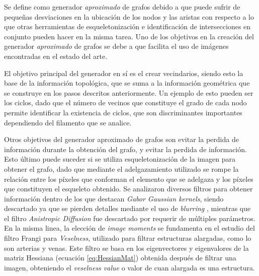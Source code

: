 Se define como generador {\it aproximado} de grafos debido a que puede sufrir de peque\~nas desviaciones en la ubicaci\'on de los nodos y las aristas con respecto a lo que otras herramientas de esqueletonizaci\'on e identificaci\'on de intersecciones en conjunto pueden hacer en la misma tarea. Uno de los objetivos en la creaci\'on del generador {\it aproximado} de grafos se debe a que facilita el uso de im\'agenes encontradas en el estado del arte.

El objetivo principal del generador en s\'i es el crear vecindarios, siendo esto la base de la informaci\'on topol\'ogica, que se suma a la informaci\'on geom\'etrica que se construye en los pasos descritos anteriormente. Un ejemplo de esto pueden ser los ciclos, dado que el n\'umero de vecinos que constituye el grado de cada nodo permite identificar la existencia de ciclos\cite{wilson1979introduction}, que son discriminantes importantes dependiendo del filamento que se analice. 


Otros objetivos del generador aproximado de grafos son evitar la perdida de informaci\'on durante la obtenci\'on del grafo, y evitar la perdida de informaci\'on. Esto \'ultimo puede suceder si se utiliza esqueletonizaci\'on de la imagen para obtener el grafo, dado que mediante el adelgazamiento utilizado se rompe la relaci\'on entre los p\'ixeles que conforman el elemento que se adelgaza y los p\'ixeles que constituyen el esqueleto obtenido. Se analizaron diversos filtros para obtener informaci\'on dentro de los que destacan {\it Gabor Gaussian kernels}, siendo descartado ya que se pierden detalles mediante el uso de {\it blurring} \cite{kerkeni2016coronary}, mientras que el filtro {\it Anistropic Diffusion} fue descartado por requerir de múltiples parámetros. En la misma linea, la elecci\'on de {\it image moments}\cite{flusser2009moments} se fundamenta en el estudio del filtro Frangi para {\it Veselness}\cite{frangi1998multiscale}\cite{fu2018frangi}, utilizado para filtrar estructuras alargadas, como lo son arterias y venas. Este filtro se basa en los eigenvectores y eigenvalores de la matriz Hessiana (ecuaci\'on \eqref{eq:HessianMat}) obtenida despu\'es de filtrar una imagen, obteniendo el {\it veselness value} o valor de cuan alargada es una estructura. 

